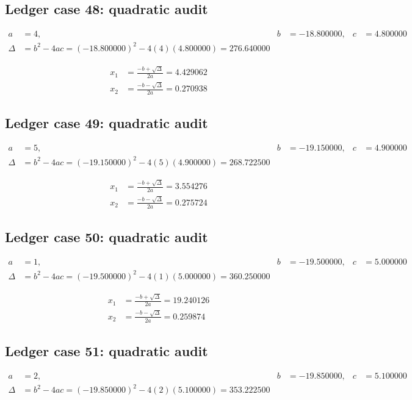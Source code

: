 \documentclass[11pt,a4paper]{article}
\begin{document}
\subsection{Ledger case 48: quadratic audit}
\begin{align}
a &= 4, & b &= -18.800000, & c &= 4.800000 \\
\Delta &= b^2-4ac = (-18.800000)^2 - 4(4)(4.800000) = 276.640000
\end{align}

\begin{align}
x_1 &= \frac{-b+\sqrt{\Delta}}{2a} = 4.429062 \\
x_2 &= \frac{-b-\sqrt{\Delta}}{2a} = 0.270938
\end{align}

\newpage

\subsection{Ledger case 49: quadratic audit}
\begin{align}
a &= 5, & b &= -19.150000, & c &= 4.900000 \\
\Delta &= b^2-4ac = (-19.150000)^2 - 4(5)(4.900000) = 268.722500
\end{align}

\begin{align}
x_1 &= \frac{-b+\sqrt{\Delta}}{2a} = 3.554276 \\
x_2 &= \frac{-b-\sqrt{\Delta}}{2a} = 0.275724
\end{align}

\subsection{Ledger case 50: quadratic audit}
\begin{align}
a &= 1, & b &= -19.500000, & c &= 5.000000 \\
\Delta &= b^2-4ac = (-19.500000)^2 - 4(1)(5.000000) = 360.250000
\end{align}

\begin{align}
x_1 &= \frac{-b+\sqrt{\Delta}}{2a} = 19.240126 \\
x_2 &= \frac{-b-\sqrt{\Delta}}{2a} = 0.259874
\end{align}

\subsection{Ledger case 51: quadratic audit}
\begin{align}
a &= 2, & b &= -19.850000, & c &= 5.100000 \\
\Delta &= b^2-4ac = (-19.850000)^2 - 4(2)(5.100000) = 353.222500
\end{align}
\end{document}
